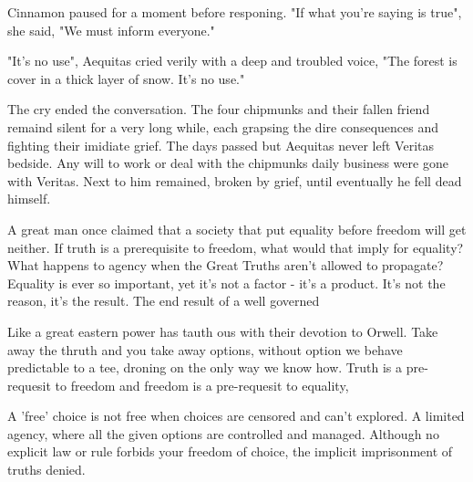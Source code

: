 Cinnamon paused for a moment before responing. "If what you're saying is true", she said, "We must inform everyone."

"It's no use", Aequitas cried verily with a deep and troubled voice, "The forest is cover in a thick layer of snow. It's no use."

The cry ended the conversation. The four chipmunks and their fallen friend remaind silent for a very long while, each grapsing the dire consequences and fighting their imidiate grief. The days passed but Aequitas never left Veritas bedside. Any will to work or deal with the chipmunks daily business were gone with Veritas. Next to him remained, broken by grief, until eventually he fell dead himself. 

A great man once claimed that a society that put equality before freedom will get neither. If truth is a prerequisite to freedom, what would that imply for equality? What happens to agency when the Great Truths aren't allowed to propagate? Equality is ever so important, yet it's not a factor - it's a product. It's not the reason, it's the result. The end result of a well governed 

Like a great eastern power has tauth ous with their devotion to Orwell. Take away the thruth and you take away options, without option we behave predictable to a tee, droning on the only way we know how. Truth is a pre-requesit to freedom and freedom is a pre-requesit to equality, 

A 'free' choice is not free when choices are censored and can't explored. A limited agency, where all the given options are controlled and managed. Although no explicit law or rule forbids your freedom of choice, the implicit imprisonment of truths denied. 